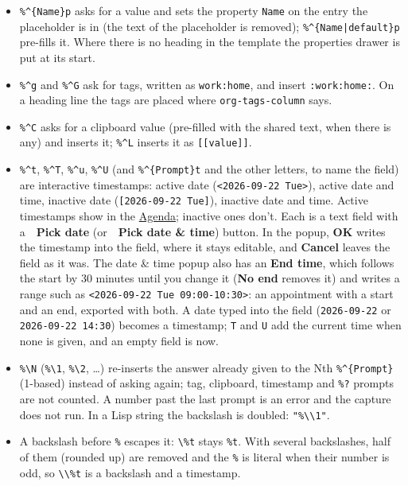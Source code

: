 \documentclass[11pt]{article}
\begin{document}
\begin{itemize}
\item \texttt{\%\textasciicircum{}\{Name\}p} asks for a value and sets the property \texttt{Name} on the entry the placeholder is in (the text of the placeholder is removed); \texttt{\%\textasciicircum{}\{Name|default\}p} pre-fills it. Where there is no heading in the template the properties drawer is put at its start.
\item \texttt{\%\textasciicircum{}g} and \texttt{\%\textasciicircum{}G} ask for tags, written as \texttt{work:home}, and insert \texttt{:work:home:}. On a heading line the tags are placed where \texttt{org-tags-column} says.
\item \texttt{\%\textasciicircum{}C} asks for a clipboard value (pre-filled with the shared text, when there is any) and inserts it; \texttt{\%\textasciicircum{}L} inserts it as \texttt{[[value]]}.
\item \texttt{\%\textasciicircum{}t}, \texttt{\%\textasciicircum{}T}, \texttt{\%\textasciicircum{}u}, \texttt{\%\textasciicircum{}U} (and \texttt{\%\textasciicircum{}\{Prompt\}t} and the other letters, to name the field) are interactive timestamps: active date (\texttt{<2026-09-22 Tue>}), active date and time, inactive date (\texttt{[2026-09-22 Tue]}), inactive date and time. Active timestamps show in the \hyperref[sec:org38ac5a3]{Agenda}; inactive ones don't. Each is a text field with a \textbf{📅 Pick date} (or \textbf{📅 Pick date \& time}) button. In the popup, \textbf{OK} writes the timestamp into the field, where it stays editable, and \textbf{Cancel} leaves the field as it was. The date \& time popup also has an \textbf{End time}, which follows the start by 30 minutes until you change it (\textbf{No end} removes it) and writes a range such as \texttt{<2026-09-22 Tue 09:00-10:30>}: an appointment with a start and an end, exported with both. A date typed into the field (\texttt{2026-09-22} or \texttt{2026-09-22 14:30}) becomes a timestamp; \texttt{T} and \texttt{U} add the current time when none is given, and an empty field is now.
\item \texttt{\%\textbackslash{}N} (\texttt{\%\textbackslash{}1}, \texttt{\%\textbackslash{}2}, \ldots{}) re-inserts the answer already given to the Nth \texttt{\%\textasciicircum{}\{Prompt\}} (1-based) instead of asking again; tag, clipboard, timestamp and \texttt{\%?} prompts are not counted. A number past the last prompt is an error and the capture does not run. In a Lisp string the backslash is doubled: \texttt{"\%\textbackslash{}\textbackslash{}1"}.
\item A backslash before \texttt{\%} escapes it: \texttt{\textbackslash{}\%t} stays \texttt{\%t}. With several backslashes, half of them (rounded up) are removed and the \texttt{\%} is literal when their number is odd, so \texttt{\textbackslash{}\textbackslash{}\%t} is a backslash and a timestamp.

\end{itemize}
\end{document}
